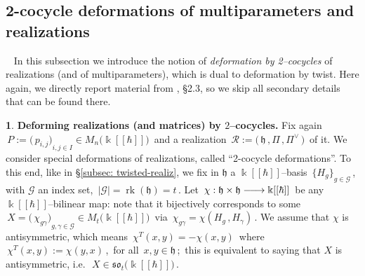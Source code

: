 \documentclass[12pt,reqno,twoside,a4paper]{amsart}
\numberwithin{equation}{section}
\theoremstyle{definition}
\newtheorem{free text}[lema]{}
\theoremstyle{remark}
\newcommand \rk{\operatorname{rk}}
\newcommand{\R}{{\mathcal R}}
\newcommand{\G}{{\mathcal G}}
\def \kh{{\Bbbk[[\hbar]]}}
\def \G {\mathcal{G}}
\def \lieh{\mathfrak{h}}
\def \lieso{\mathfrak{so}}
\theoremstyle{plain}
\begin{document}
\medskip


\subsection{2-cocycle deformations of multiparameters and realizations}
%
  \label{subsec: 2-cocycle-realiz}  {\ }
%
 \vskip7pt
%
   In this subsection we introduce the notion of  \textit{deformation by 2--cocycles\/}  of realizations (and of multiparameters), which is dual to deformation by twist.  Here again, we directly report material from  \cite{GG3}, \S 2.3,  so we skip all secondary details that can be found there.

\vskip7pt

\begin{free text}  \label{2-cocycle-deform.'s x mpmatr.'s & realiz.'s}
%
 {\bf Deforming realizations (and matrices) by  $ 2 $--cocycles.}  Fix again
 $ \, P := {\big(\, p_{i,j} \big)}_{i, j \in I} \in M_n\big( \kh \big) \, $  and a realization
 $ \, \R := \big(\, \lieh \, , \Pi \, , \Pi^\vee \,\big) \, $  of it.
 We consider special deformations of realizations, called ``2-cocycle deformations''.  To this end, like in  \S \ref{subsec: twisted-realiz},  we fix in  $ \lieh $  a  $ \kh $--basis
 $ \, {\big\{ H_g \big\}}_{g \in \G} \, $,  with  $ \G $  an index set,  $ \, |\G| = \rk(\lieh) = t \, $.
%
 \vskip5pt
%
   Let  $ \, \chi : \lieh \times \lieh \relbar\joinrel\longrightarrow \kh \, $  be any  $ \kh $--bilinear  map:
   note that it bijectively corresponds to some
   $ \, X = {\big(\, \chi_{g{}\gamma} \big)}_{g , \gamma \in \G} \in M_t\big(\kh\big) \, $  via
   $ \, \chi_{g{}\gamma} = \chi(H_g\,,H_\gamma) \, $.  We assume that  $ \chi $ is antisymmetric, which means
   $ \, \chi^{\scriptscriptstyle T}(x,y) = -\chi(x,y) \, $  where
   $ \, \chi^{\scriptscriptstyle T}(x,y) := \chi(y,x) \, $,  \,for all  $ \, x, y \in \lieh \, $;
   \,this is equivalent to saying that  $ X $  is antisymmetric, i.e.\  $ \, X \in \lieso_t\big(\kh\big) \, $.

\end{free text}
\end{document}
